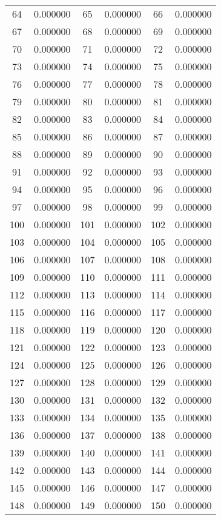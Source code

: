 \documentclass[12pt]{article}
\begin{document}
\begin{longtable}{@{}cc|cc|cc@{}}
64 & 0.000000 & 65 & 0.000000 & 66 & 0.000000 \\
67 & 0.000000 & 68 & 0.000000 & 69 & 0.000000 \\
70 & 0.000000 & 71 & 0.000000 & 72 & 0.000000 \\
73 & 0.000000 & 74 & 0.000000 & 75 & 0.000000 \\
76 & 0.000000 & 77 & 0.000000 & 78 & 0.000000 \\
79 & 0.000000 & 80 & 0.000000 & 81 & 0.000000 \\
82 & 0.000000 & 83 & 0.000000 & 84 & 0.000000 \\
85 & 0.000000 & 86 & 0.000000 & 87 & 0.000000 \\
88 & 0.000000 & 89 & 0.000000 & 90 & 0.000000 \\
91 & 0.000000 & 92 & 0.000000 & 93 & 0.000000 \\
94 & 0.000000 & 95 & 0.000000 & 96 & 0.000000 \\
97 & 0.000000 & 98 & 0.000000 & 99 & 0.000000 \\
100 & 0.000000 & 101 & 0.000000 & 102 & 0.000000 \\
103 & 0.000000 & 104 & 0.000000 & 105 & 0.000000 \\
106 & 0.000000 & 107 & 0.000000 & 108 & 0.000000 \\
109 & 0.000000 & 110 & 0.000000 & 111 & 0.000000 \\
112 & 0.000000 & 113 & 0.000000 & 114 & 0.000000 \\
115 & 0.000000 & 116 & 0.000000 & 117 & 0.000000 \\
118 & 0.000000 & 119 & 0.000000 & 120 & 0.000000 \\
121 & 0.000000 & 122 & 0.000000 & 123 & 0.000000 \\
124 & 0.000000 & 125 & 0.000000 & 126 & 0.000000 \\
127 & 0.000000 & 128 & 0.000000 & 129 & 0.000000 \\
130 & 0.000000 & 131 & 0.000000 & 132 & 0.000000 \\
133 & 0.000000 & 134 & 0.000000 & 135 & 0.000000 \\
136 & 0.000000 & 137 & 0.000000 & 138 & 0.000000 \\
139 & 0.000000 & 140 & 0.000000 & 141 & 0.000000 \\
142 & 0.000000 & 143 & 0.000000 & 144 & 0.000000 \\
145 & 0.000000 & 146 & 0.000000 & 147 & 0.000000 \\
148 & 0.000000 & 149 & 0.000000 & 150 & 0.000000 \\

\end{longtable}
\end{document}

